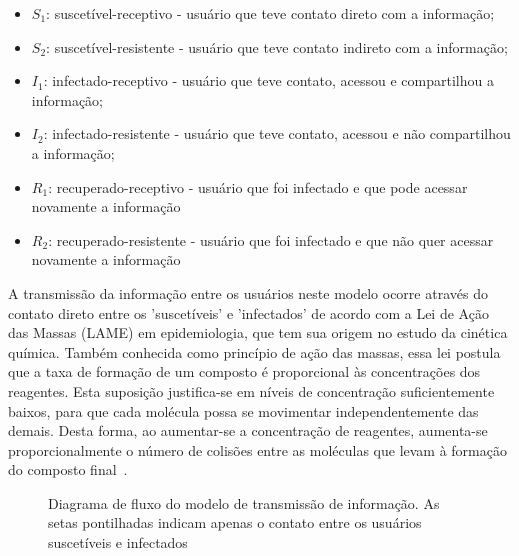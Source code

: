 \documentclass[
	12pt,				%
	openright,			%
	oneside,			%
	a4paper,			%
	english,			%
	french,				%
	spanish,			%
	brazil				%
	]{abntex2}
\begin{document}
\begin{itemize}
\item $S_1$: suscetível-receptivo - usuário que teve contato direto com a informação;
\item $S_2$: suscetível-resistente - usuário que teve contato indireto com a informação;
\item $I_1$: infectado-receptivo - usuário que teve contato, acessou e compartilhou a informação;
\item $I_2$: infectado-resistente - usuário que teve contato, acessou e não compartilhou a informação;
\item $R_1$: recuperado-receptivo - usuário que foi infectado e que pode acessar novamente a informação
\item $R_2$: recuperado-resistente - usuário que foi infectado e que não quer acessar novamente a informação
\end{itemize}

A transmissão da informação entre os usuários neste modelo ocorre
através do contato direto entre os 'suscetíveis' e 'infectados' de
acordo com a Lei de Ação das Massas (LAME) em epidemiologia, que tem
sua origem no estudo da cinética química. Também conhecida como
princípio de ação das massas, essa lei postula que a taxa de formação
de um composto é proporcional às concentrações dos reagentes. Esta
suposição justifica-se em níveis de concentração suficientemente
baixos, para que cada molécula possa se movimentar independentemente
das demais. Desta forma, ao aumentar-se a concentração de reagentes,
aumenta-se proporcionalmente o número de colisões entre as moléculas
que levam à formação do composto final~\cite{coutinho2004}.

\begin{center}
    \begin{figure}
      \begin{center}
        \setlength\fboxsep{0pt}
        \setlength\fboxrule{0pt}
        \caption{Diagrama de fluxo do modelo de transmissão de
          informação. As setas pontilhadas indicam apenas o contato
          entre os usuários suscetíveis e infectados}
        \label{fig:diagramadefluxo}
      \end{center}
    \end{figure}
\end{center}
\end{document}

